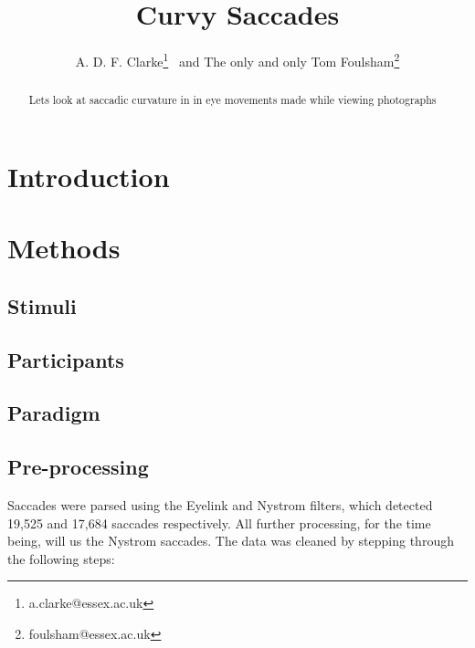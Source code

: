 \documentclass[a4paper, oneside, 11pt, onecolumn]{article}
\begin{document}
\title{Curvy Saccades}

\author{A. D. F. Clarke\thanks{a.clarke@essex.ac.uk} \ and The only and only Tom Foulsham\thanks{foulsham@essex.ac.uk}}



\maketitle

\begin{abstract}
Lets look at saccadic curvature in in eye movements made while viewing photographs
\end{abstract}

\section{Introduction}


\section{Methods}


\subsection{Stimuli}

\subsection{Participants}

\subsection{Paradigm}

\subsection{Pre-processing}

Saccades were parsed using the Eyelink and Nystrom filters, which detected 19,525 and 17,684 saccades respectively. All further processing, for the time being, will us the Nystrom saccades. The data was cleaned by stepping through the following steps:
\end{document}
